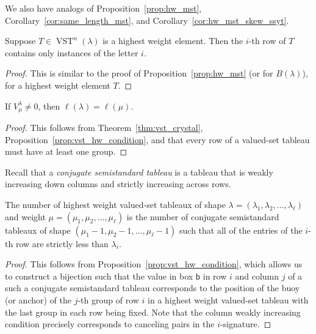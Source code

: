 \documentclass[ALCO,ThmDefs,Unicode,epreuves]{cedram}
\newcommand{\bbb}{\mathsf{b}}
\DeclareMathOperator{\vst}{VST} %
\newcommand{\defn}[1]{{\color{darkred}\emph{#1}}} %
\begin{document}
We also have analogs of Proposition~\ref{prop:hw_mst}, Corollary~\ref{cor:same_length_mst}, and Corollary~\ref{cor:hw_mst_skew_ssyt}.

\begin{prop}
\label{prop:vst_hw_condition}
Suppose $T \in \vst^n(\lambda)$ is a highest weight element.  Then the $i$-th row of $T$ contains only instances of the letter $i$.
\end{prop}

\begin{proof}
This is similar to the proof of Proposition~\ref{prop:hw_mst} (or for $B(\lambda)$), for a highest weight element $T$.
\end{proof}

\begin{coro}
If $V_{\mu}^{\lambda} \neq 0$, then $\ell(\lambda) = \ell(\mu)$.
\end{coro}

\begin{proof}
This follows from Theorem~\ref{thm:vst_crystal}, Proposition~\ref{prop:vst_hw_condition}, and that every row of a valued-set tableau must have at least one group.
\end{proof}

Recall that a \defn{conjugate semistandard tableau} is a tableau that is weakly increasing down columns and strictly increasing across rows.

\begin{coro}
\label{cor:vst_hw_counting}
The number of highest weight valued-set tableaux of shape $\lambda = (\lambda_1, \lambda_2, \dotsc, \lambda_{\ell})$ and weight $\mu = (\mu_1, \mu_2, \dotsc, \mu_{\ell})$ is the number of conjugate semistandard tableaux of shape $(\mu_1-1, \mu_2-1, \dotsc, \mu_{\ell} - 1)$ such that all of the entries of the $i$-th row are strictly less than $\lambda_i$.
\end{coro}

\begin{proof}
This follows from Proposition~\ref{prop:vst_hw_condition}, which allows us to construct a bijection such that the value in box $\bbb$ in row $i$ and column $j$ of a such a conjugate semistandard tableau corresponds to the position of the buoy (or anchor) of the $j$-th group of row $i$ in a highest weight valued-set tableau with the last group in each row being fixed. Note that the column weakly increasing condition precisely corresponds to canceling pairs in the $i$-signature.
\end{proof}
\end{document}

